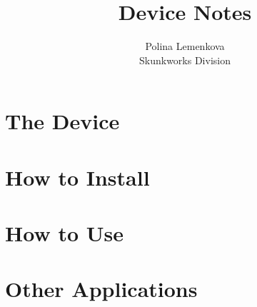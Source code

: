 \documentclass[letterpaper]{ltxdoc}
\begin{document}
\title{\textsf{Device Notes}}
\author{Polina Lemenkova 
\\Skunkworks Division}
\maketitle

\abstract{\lipsum[3]}
\tableofcontents
{}
\section{The Device}
\lipsum[30]
\section{How to Install}
\lipsum[33]
\section{How to Use}
\lipsum[37]
\section{Other Applications}
\lipsum[41]
\end{document}
